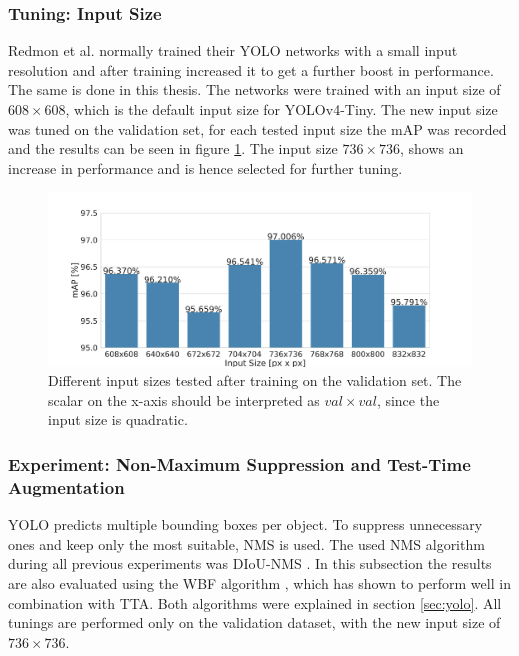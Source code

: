 \subsubsection{Tuning: Input Size}

Redmon et al. \cite{yolov2} normally trained their YOLO networks with a small input resolution and after training increased it to get a further boost in performance.
The same is done in this thesis.
The networks were trained with an input size of $608 \times 608$, which is the default input size for \ac{YOLOv4}-Tiny.
The new input size was tuned on the validation set, for each tested input size the \ac{mAP} was recorded and the results can be seen in figure \ref{fig:yolo_input_size}.
The input size $736 \times 736$, shows an increase in performance and is hence selected for further tuning.

\begin{figure}
\begin{center}
    \includegraphics[width=14cm]{imgs/yolo_input_size_tuning.pdf}
    \caption{Different input sizes tested after training on the validation set. The scalar on the x-axis should be interpreted as $val \times val$, since the input size is quadratic.}
    \label{fig:yolo_input_size}
\end{center}
\end{figure}

\subsubsection{Experiment: Non-Maximum Suppression and Test-Time Augmentation}

YOLO predicts multiple bounding boxes per object.
To suppress unnecessary ones and keep only the most suitable, \ac{NMS} is used.
The used \ac{NMS} algorithm during all previous experiments was \ac{DIoU}-\ac{NMS} \cite{diou}.
In this subsection the results are also evaluated using the \ac{WBF} algorithm \cite{weighted_bbox_fusion}, which has shown to perform well in combination with \ac{TTA}.
Both algorithms were explained in section \ref{sec:yolo}.
All tunings are performed only on the validation dataset, with the new input size of $736 \times 736$.

